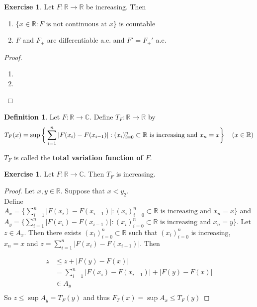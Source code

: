 \documentclass{book}
\theoremstyle{definition}
\newtheorem{defn}[definition]{Definition}
\newtheorem{ex}[definition]{Exercise}
\newcommand{\C}{\mathbb{C}}
\newcommand{\R}{\mathbb{R}}
\newcommand{\lex}[1]{\label{ex:#1}}
\newcommand{\ld}[1]{\label{defn:#1}}
\DeclareMathOperator*{\0}{\mbf{0}}
\DeclareMathOperator*{\1}{\mbf{1}}
\begin{document}
	\begin{ex}
		Let $F:\R \rightarrow \R$ be increasing. Then 
		\begin{enumerate}
			\item $\{x \in \R: F \text{ is not continuous at }x\}$ is countable
			\item $F$ and $F_+$ are differentiable a.e. and $F' = F_+'$ a.e.
		\end{enumerate}
	\end{ex}

	\begin{proof}\
		\begin{enumerate}
			\item 
			\item 
		\end{enumerate}
	\end{proof}
	
	\begin{defn} \ld{00000} 
		Let $F:\R \rightarrow \C$. Define $T_F:\R \rightarrow \R$ by $$T_F(x) = \sup\bigg \{\sum_{i=1}^{n}|F(x_{i}) - F(x_{i-1})|: (x_i)_{i=0}^n \subset \R \text{ is increasing and } x_n=x  \bigg \} \hspace{4mm} (x \in \R)$$
		
		$T_F$ is called the \textbf{total variation function of $F$}.
	\end{defn}
	
	\begin{ex} \lex{00000} 
		Let $F:\R \rightarrow \C$. Then $T_F$ is increasing.
	\end{ex}
	
	\begin{proof}
		Let $x,y \in \R$. Suppose that $x<y_2$. \\Define  $A_x = \big \{\sum_{i=1}^{n}|F(x_{i}) - F(x_{i-1})|: (x_i)_{i=0}^n \subset \R \text{ is increasing and } x_n=x  \big \}$ and \\$A_y = \big \{\sum_{i=1}^{n}|F(x_{i}) - F(x_{i-1})|: (x_i)_{i=0}^n \subset \R \text{ is increasing and } x_n=y  \big \}$. Let $z \in A_x$. Then there exists $(x_i)_{i=0}^n \subset \R$ such that $(x_i)_{i=0}^n$ is increasing,\\ $x_n=x$ and $z = \sum_{i=1}^n |F(x_{i}) - F(x_{i-1})|$. Then
		
		\begin{align*}
			z 
			& \leq z+|F(y)-F(x)|\\
			&= \sum_{i=1}^n |F(x_{i}) - F(x_{i-1})| + |F(y)-F(x)|\\
			& \in A_y\\
		\end{align*} 
		So $z \leq \sup A_y = T_F(y) $ and thus $F_T(x)  = \sup A_x \leq T_F(y)$
	\end{proof}
	
\end{document}
